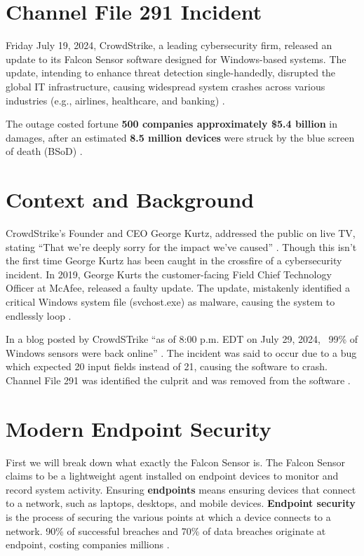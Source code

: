 

\section{Channel File 291 Incident}
\label{sec:crowd}

Friday July 19, 2024, CrowdStrike, a leading cybersecurity firm, released an update to its Falcon Sensor
software designed for Windows-based systems. The update, intending to enhance threat detection single-handedly,
disrupted the global IT infrastructure, causing widespread system crashes across various industries
(e.g., airlines, healthcare, and banking) \cite{crowdstrike2024falcon}. 

The outage costed fortune \textbf{500 companies approximately \$5.4 billion} in damages, after an 
estimated \textbf{8.5 million devices} were struck by the blue screen of death (BSoD) \cite{tidy_crowdstrike_outage_2024}\cite{kerner_crowdstrike_outage_2024}.

\section{Context and Background}
\label{sec:context}

CrowdStrike's Founder and CEO George Kurtz, addressed the public on live TV, stating ``That we're deeply sorry for the impact we've caused'' \cite{sato_crowdstrike_ceo_2024}.
Though this isn't the first time George Kurtz has been caught in the crossfire of a cybersecurity incident.
In 2019, George Kurts the customer-facing Field Chief Technology Officer at McAfee, released a faulty update.
The update, mistakenly identified a critical Windows system file (svchost.exe) as malware, causing the system to endlessly loop \cite{volenik_crowdstrike_ceo_2024}.

In a blog posted by CrowdSTrike ``as of 8:00 p.m. EDT on July 29, 2024, ~99\% of Windows sensors were back online'' \cite{crowdstrike_channel_file_291_2024}.
The incident was said to occur due to a bug which expected 20 input fields instead of 21, causing the software to crash. Channel File 291 was identified the 
culprit and was removed from the software \cite{crowdstrike_channel_file_291_2024}.

\section{Modern Endpoint Security}
\label{sec:falcon}

First we will break down what exactly the Falcon Sensor is. The Falcon Sensor claims to be a lightweight agent installed on endpoint devices to monitor and record system activity.
Ensuring \textbf{endpoints} means ensuring devices that connect to a network, such as laptops, desktops, and mobile devices. \textbf{Endpoint security} is the process of 
securing the various points at which a device connects to a network. 90\% of successful breaches and 70\% of data breaches originate at endpoint,
costing companies millions \cite{ibm_endpoint_security}. 

